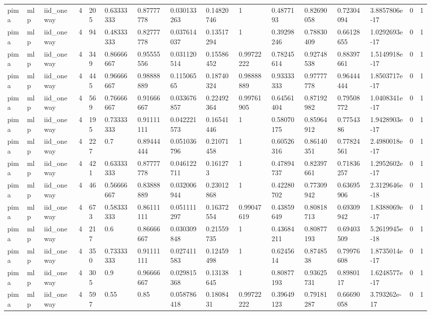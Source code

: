 \begin{tabular}{llllllllllllllll}
pima & mlp & iid\_oneway & 4 & 205 & 0.63333333 & 0.87777778 & 0.030133263 & 0.14820746 & 1 & 0.4877193 & 0.82690058 & 0.72304094 & 3.8857806e-17 & 0 & 1 \\
pima & mlp & iid\_oneway & 4 & 94 & 0.48333333 & 0.82777778 & 0.037614037 & 0.13517294 & 1 & 0.39298246 & 0.78830409 & 0.66128655 & 1.0292693e-17 & 0 & 1 \\
pima & mlp & iid\_oneway & 4 & 349 & 0.86666667 & 0.95555556 & 0.031120514 & 0.15586452 & 0.99722222 & 0.78245614 & 0.92748538 & 0.88397661 & 1.5149918e-17 & 0 & 1 \\
pima & mlp & iid\_oneway & 4 & 445 & 0.96666667 & 0.98888889 & 0.11506565 & 0.18740324 & 0.98888889 & 0.93333333 & 0.97777778 & 0.96444444 & 1.8503717e-17 & 0 & 1 \\
pima & mlp & iid\_oneway & 4 & 569 & 0.76666667 & 0.91666667 & 0.033676857 & 0.22492364 & 0.99761905 & 0.64561404 & 0.87192982 & 0.79508772 & 1.0408341e-17 & 0 & 1 \\
pima & mlp & iid\_oneway & 4 & 195 & 0.73333333 & 0.91111111 & 0.042221573 & 0.16541446 & 1 & 0.58070175 & 0.85964912 & 0.7754386 & 1.9428903e-17 & 0 & 1 \\
pima & mlp & iid\_oneway & 4 & 227 & 0.7 & 0.89444444 & 0.051036796 & 0.21071458 & 1 & 0.60526316 & 0.86140351 & 0.77824561 & 2.4980018e-17 & 0 & 1 \\
pima & mlp & iid\_oneway & 4 & 421 & 0.63333333 & 0.87777778 & 0.046122711 & 0.161273 & 1 & 0.47894737 & 0.82397661 & 0.71836257 & 1.2952602e-17 & 0 & 1 \\
pima & mlp & iid\_oneway & 4 & 46 & 0.56666667 & 0.83888889 & 0.032006944 & 0.23012868 & 1 & 0.42280702 & 0.77309942 & 0.63695906 & 2.3129646e-18 & 0 & 1 \\
pima & mlp & iid\_oneway & 4 & 673 & 0.58333333 & 0.86111111 & 0.051111297 & 0.16372554 & 0.99047619 & 0.43859649 & 0.80818713 & 0.69309942 & 1.8388069e-17 & 0 & 1 \\
pima & mlp & iid\_oneway & 4 & 217 & 0.6 & 0.86666667 & 0.030309848 & 0.21559735 & 1 & 0.43684211 & 0.80877193 & 0.69403509 & 5.2619945e-18 & 0 & 1 \\
pima & mlp & iid\_oneway & 4 & 350 & 0.73333333 & 0.91111111 & 0.027411583 & 0.12459498 & 1 & 0.6245614 & 0.8748538 & 0.79976608 & 1.8735014e-17 & 0 & 1 \\
pima & mlp & iid\_oneway & 4 & 305 & 0.9 & 0.96666667 & 0.029815368 & 0.13138645 & 1 & 0.80877193 & 0.93625731 & 0.8980117 & 1.6248577e-17 & 0 & 1 \\
pima & mlp & iid\_oneway & 4 & 597 & 0.55 & 0.85 & 0.058786418 & 0.1808431 & 0.99722222 & 0.39649123 & 0.79181287 & 0.66690058 & 3.793262e-17 & 0 & 1 \\

\end{tabular}
